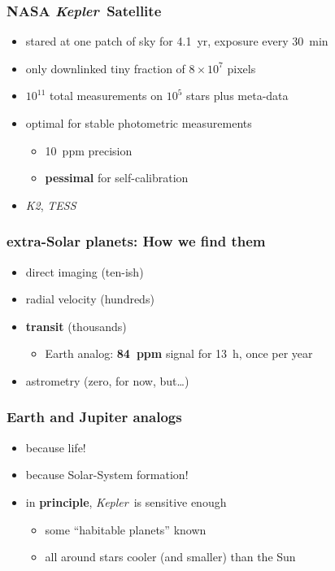 \documentclass{beamer}
\renewcommand{\emph}[1]{\textbf{#1}}
\newcommand{\project}[1]{\textsl{#1}}
\newcommand{\Kepler}{\project{Kepler}}
\begin{document}
\begin{frame}
  \frametitle{NASA \Kepler\ Satellite}
  \begin{itemize}
  \item stared at one patch of sky for 4.1~yr, exposure every 30~min
  \item only downlinked tiny fraction of $8\times 10^7$ pixels
  \item $10^{11}$ total measurements on $10^5$ stars plus meta-data
  \item optimal for stable photometric measurements
    \begin{itemize}
    \item 10~ppm precision
    \item \emph{pessimal} for self-calibration
    \end{itemize}
  \item \project{K2}, \project{TESS}
  \end{itemize}
\end{frame}

\begin{frame}
  \frametitle{extra-Solar planets: How we find them}
  \begin{itemize}
  \item direct imaging (ten-ish)
  \item radial velocity (hundreds)
  \item \emph{transit} (thousands)
    \begin{itemize}
    \item Earth analog: \emph{84~ppm} signal for 13~h, once per year
    \end{itemize}
  \item astrometry (zero, for now, but\ldots)
  \end{itemize}
\end{frame}

\begin{frame}
  \frametitle{Earth and Jupiter analogs}
  \begin{itemize}
  \item because life!
  \item because Solar-System formation!
  \item in \emph{principle}, \Kepler\ is sensitive enough
    \begin{itemize}
    \item some ``habitable planets'' known
    \item all around stars cooler (and smaller) than the Sun
    \end{itemize}
  \end{itemize}
\end{frame}
\end{document}
